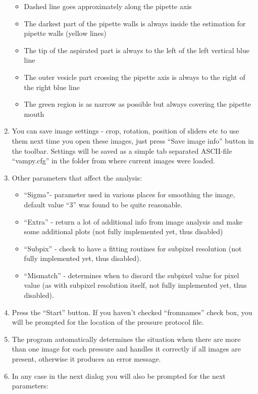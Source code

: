 \documentclass[a4paper,12pt]{article}
\begin{document}
\begin{enumerate}
\begin{itemize}
		\item Dashed line goes approximately along the pipette axis
		\item The darkest part of the pipette walls is always inside the estimation for pipette walls (yellow lines)
		\item The tip of the aspirated part is always to the left of the left vertical blue line
		\item The outer vesicle part crossing the pipette axis is always to the right of the right blue line
		\item The green region is as narrow as possible but always covering the pipette mouth
	\end{itemize} 
	\item You can save image settings - crop, rotation, position of sliders etc to use them next time you open these images, just press ``Save image info'' button in the toolbar. Settings will be saved as a simple tab separated ASCII-file ``vampy.cfg'' in the folder from where current images were loaded.
	\item Other parameters that affect the analysis:
	\begin{itemize}
		\item ``Sigma''- parameter used in various places for smoothing the image, default value ``3'' was found to be quite reasonable.
		\item ``Extra'' - return a lot of additional info from image analysis and make some additional plots (not fully implemented yet, thus disabled)
		\item ``Subpix'' - check to have a fitting routines for subpixel resolution (not fully implemented yet, thus disabled).
		\item ``Mismatch'' - determines when to discard the subpixel value for pixel value (as with subpixel resolution itself, not fully implemented yet, thus disabled).
	\end{itemize}
	\item Press the ``Start'' button. If you haven't checked ``fromnames'' check box, you will be prompted for the location of the pressure protocol file.
	\item The program automatically determines the situation when there are more than one image for each pressure and handles it correctly if all images are present, otherwise it produces an error message.
	\item In any case in the next dialog you will also be prompted for the next parameters:
	\begin{itemize}

\end{itemize}
\end{enumerate}
\end{document}
